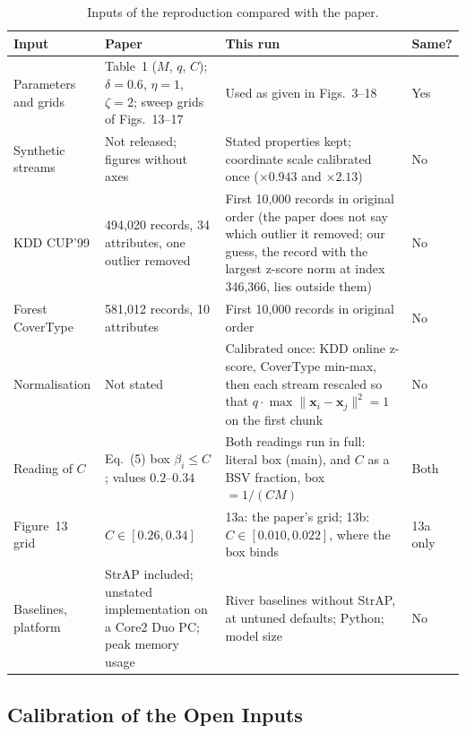 \begin{table}[!ht]
\centering
\caption{Inputs of the reproduction compared with the paper.}
\label{tab:svstream_inputs}
\footnotesize
\begin{tabularx}{\textwidth}{@{}l L L l@{}}
\toprule
\textbf{Input} & \textbf{Paper} & \textbf{This run} & \textbf{Same?} \\
\midrule
Parameters and grids & Table~1 ($M$, $q$, $C$); $\delta=0.6$, $\eta=1$, $\zeta=2$; sweep grids of Figs.~13--17 & Used as given in Figs.~3--18 & Yes \\
Synthetic streams & Not released; figures without axes & Stated properties kept; coordinate scale calibrated once ($\times 0.943$ and $\times 2.13$) & No \\
KDD CUP'99 & 494,020 records, 34 attributes, one outlier removed & First 10,000 records in original order (the paper does not say which outlier it removed; our guess, the record with the largest z-score norm at index 346,366, lies outside them) & No \\
Forest CoverType & 581,012 records, 10 attributes & First 10,000 records in original order & No \\
Normalisation & Not stated & Calibrated once: KDD online z-score, CoverType min-max, then each stream rescaled so that $q \cdot \max\|\mathbf{x}_i-\mathbf{x}_j\|^2 = 1$ on the first chunk & No \\
Reading of $C$ & Eq.~(5) box $\beta_i \le C$; values $0.2$--$0.34$ & Both readings run in full: literal box (main), and $C$ as a BSV fraction, box $= 1/(CM)$ & Both \\
Figure~13 grid & $C \in [0.26, 0.34]$ & 13a: the paper's grid; 13b: $C \in [0.010, 0.022]$, where the box binds & 13a only \\
Baselines, platform & StrAP included; unstated implementation on a Core2 Duo PC; peak memory usage & River baselines without StrAP, at untuned defaults; Python; model size & No \\
\bottomrule
\end{tabularx}
\end{table}

\subsection{Calibration of the Open Inputs}
\label{subsec:svstream_calibration}


